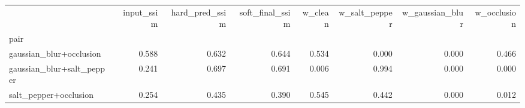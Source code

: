 \begin{tabular}{lrrrrrrr}
\toprule
 & input_ssim & hard_pred_ssim & soft_final_ssim & w_clean & w_salt_pepper & w_gaussian_blur & w_occlusion \\
pair &  &  &  &  &  &  &  \\
\midrule
gaussian_blur+occlusion & 0.588 & 0.632 & 0.644 & 0.534 & 0.000 & 0.000 & 0.466 \\
gaussian_blur+salt_pepper & 0.241 & 0.697 & 0.691 & 0.006 & 0.994 & 0.000 & 0.000 \\
salt_pepper+occlusion & 0.254 & 0.435 & 0.390 & 0.545 & 0.442 & 0.000 & 0.012 \\
\bottomrule
\end{tabular}
